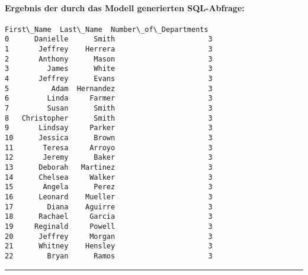 \documentclass[11pt]{article}
\begin{document}
    
    \hypertarget{ergebnis-der-durch-das-modell-generierten-sql-abfrage}{%
\paragraph{Ergebnis der durch das Modell generierten
SQL-Abfrage:}\label{ergebnis-der-durch-das-modell-generierten-sql-abfrage}}

    
    
    \begin{Verbatim}[commandchars=\\\{\}]
     First\_Name  Last\_Name  Number\_of\_Departments
0      Danielle      Smith                      3
1       Jeffrey    Herrera                      3
2       Anthony      Mason                      3
3         James      White                      3
4       Jeffrey      Evans                      3
5          Adam  Hernandez                      3
6         Linda     Farmer                      3
7         Susan      Smith                      3
8   Christopher      Smith                      3
9       Lindsay     Parker                      3
10      Jessica      Brown                      3
11       Teresa     Arroyo                      3
12       Jeremy      Baker                      3
13      Deborah   Martinez                      3
14      Chelsea     Walker                      3
15       Angela      Perez                      3
16      Leonard    Mueller                      3
17        Diana    Aguirre                      3
18      Rachael     Garcia                      3
19     Reginald     Powell                      3
20      Jeffrey     Morgan                      3
21      Whitney    Hensley                      3
22        Bryan      Ramos                      3
    \end{Verbatim}

    
    \begin{center}\rule{0.5\linewidth}{0.5pt}\end{center}

    

    
    
    
\end{document}
